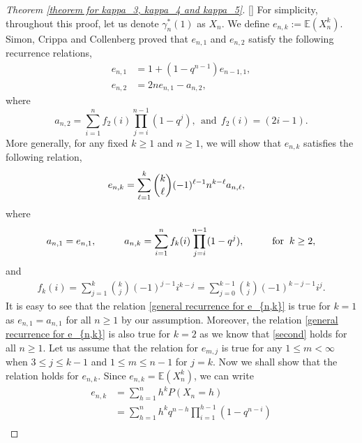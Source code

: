 \documentclass[11pt,reqno]{amsart}
\renewcommand{\(}{\left\(}
\renewcommand{\)}{\right\)}
\renewcommand{\[}{\left\[}
\renewcommand{\]}{\right\]}
\numberwithin{equation}{section}
\theoremstyle{plain}
\begin{document}
\begin{proof}[Theorem \ref{theorem for kappa_3, kappa_4 and kappa_5}][]
For simplicity,  throughout this proof,  let us denote $\gamma_n^*(1)$ as $X_n$.
We define  $e_{n,k}:=\mathbb{E}(X_n^k)$.  
Simon,  Crippa and Collenberg \cite{SCC1993} proved  that $e_{n,1}$ and $e_{n,2}$ satisfy the following recurrence relations,
\begin{align}
e_{n,1} &= 1 + (1- q^{n-1}) e_{n-1, 1},  \label{first}\\
e_{n, 2} &= 2 n e_{n, 1} - a_{n,  2}, \label{second}
\end{align}
where $$a_{n,2}= \sum_{i=1}^n f_2(i) \prod_{j=i}^{n-1} (1- q^j), ~~ \textrm{and}~~ f_2(i)= (2i-1).  $$
More generally,  for any fixed $k \geq 1$ and $n \geq 1$,   we will show that $e_{n,k}$ satisfies the 
 following relation,   
\begin{align}\label{general recurrence for e_{n,k}}
e_{n,k} 
&= \sum_{\ell=1}^{k} {k \choose \ell} (-1)^{\ell-1}n^{k-\ell} a_{n,  \ell},  
\end{align}
where
\begin{align}\label{defn of a_{n,k}}
a_{n,1}=e_{n,1},\hspace{1cm}a_{n,k}=\sum_{i=1}^nf_k(i)\prod_{j=i}^{n-1} (1-q^j),\hspace{1cm} \mathrm{for}\hspace{0.2cm} k\geq 2,
\end{align}
and
\begin{align}\label{defn of f_k}
f_k(i)=\sum_{j=1}^k {k \choose j} (-1)^{j-1} i^{k-j}=\sum_{j=0}^{k-1}{k\choose j}(-1)^{k-j-1}i^j.
\end{align}
It is easy to see that the relation \eqref{general recurrence for e_{n,k}} is true for $k=1$ as $e_{n,1}=a_{n,1}$ for all $n \geq 1$ by our assumption.   Moreover,   the relation \eqref{general recurrence for e_{n,k}} is also true for $k=2$ as we know that \eqref{second} holds for all $n \geq 1$.  Let us assume that the relation for $e_{m,  j}$ is true for any $1 \leq m < \infty$ when $ 3 \leq j \leq k-1$ and   $ 1\leq m \leq n-1$ for $ j=k$.  Now we shall show that the relation holds for $e_{n,k}$.  Since $e_{n,k}= \mathbb{E}(X_n^k)$,   we can write
{\allowdisplaybreaks
\begin{align}
e_{n,k}  & = \sum_{h=1}^n h^k P(X_n =h) \nonumber \\
& = \sum_{h=1}^n h^k q^{n-h} \prod_{i=1}^{h-1} (1- q^{n-i}) \nonumber \\

\end{align}}
\end{proof}
\end{document}

